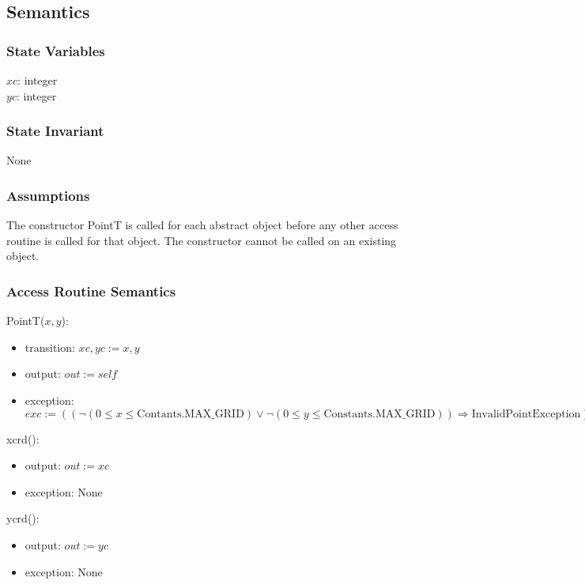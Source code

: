 \documentclass[12pt]{article}
\begin{document}
\subsection* {Semantics}

\subsubsection* {State Variables}

$xc$: integer\\
$yc$: integer

\subsubsection* {State Invariant}

None

\subsubsection* {Assumptions}
The constructor PointT is called for each abstract object before any other access routine is called for that
object.  The constructor cannot be called on an existing object.

\subsubsection* {Access Routine Semantics}

PointT($x, y$):
\begin{itemize}
\item transition: $xc, yc := x, y$
\item output: $out := \mathit{self}$
\item exception:
 $exc := ((\neg(0 \leq x \leq \mbox{Contants.MAX\_GRID}) \vee \neg(0 \leq y \leq \mbox{Constants.MAX\_GRID})) \Rightarrow
\mbox{InvalidPointException})$
\end{itemize}

\noindent xcrd():
\begin{itemize}
\item output: $out := xc$
\item exception: None
\end{itemize}

\noindent ycrd():
\begin{itemize}
\item output: $out := yc$
\item exception: None
\end{itemize}
\end{document}
